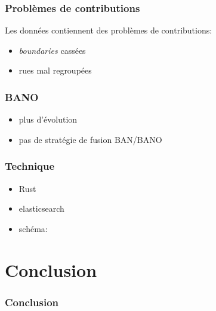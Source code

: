 \documentclass[table]{beamer}
\newcommand*{\foreign}[2][english]{%
    \emph{\foreignlanguage{#1}{#2}}%
}
\begin{document}
\begin{frame}
  \frametitle{Problèmes de contributions}

  Les données contiennent des problèmes de contributions:
  \begin{itemize}
  \item \foreign{boundaries} cassées
  \item rues mal regroupées
  \end{itemize}
\end{frame}

\begin{frame}
  \frametitle{BANO}

  \begin{itemize}
  \item plus d'évolution
  \item pas de stratégie de fusion BAN/BANO
  \end{itemize}
\end{frame}

\begin{frame}
  \frametitle{Technique}

  \begin{itemize}
  \item Rust
  \item elasticsearch
  \item schéma:
  \end{itemize}
\end{frame}

\section{Conclusion}

\begin{frame}
  \frametitle{Conclusion}

\end{frame}

\begin{frame}
  \titlepage
\end{frame}
\end{document}

